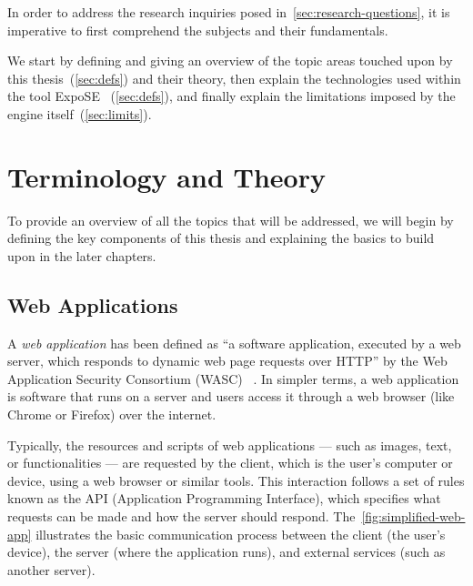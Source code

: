 In order to address the research inquiries posed in~\autoref{sec:research-questions}, it is imperative to first comprehend the subjects and their fundamentals. 

We start by defining  and giving an overview of the topic areas touched upon by this thesis~(\autoref{sec:defs}) and their theory, then explain the technologies used within the tool ExpoSE ~(\autoref{sec:defs}), and finally explain the limitations imposed by the engine itself~(\autoref{sec:limits}). 

\section{Terminology and Theory}
\label{sec:defs}
To provide an overview of all the topics that will be addressed, we will begin by defining the key components of this thesis and explaining the basics to build upon in the later chapters. 
\subsection{Web Applications}
\label{sec:webapp}
A \textit{web application} has been defined as “a software application, executed by a web server, which responds to dynamic web page requests over HTTP” by the Web Application Security Consortium (WASC) ~\cite{noauthor_web_2012}. 
In simpler terms, a web application is software that runs on a server and users access it through a web browser (like Chrome or Firefox) over the internet.

Typically, the resources and scripts of web applications — such as images, text, or functionalities — are requested by the client, which is the user's computer or device, using a web browser or similar tools. This interaction follows a set of rules known as the API (Application Programming Interface), which specifies what requests can be made and how the server should respond.
The~\autoref{fig:simplified-web-app} illustrates the basic communication process between the client (the user's device), the server (where the application runs), and external services (such as another server).


